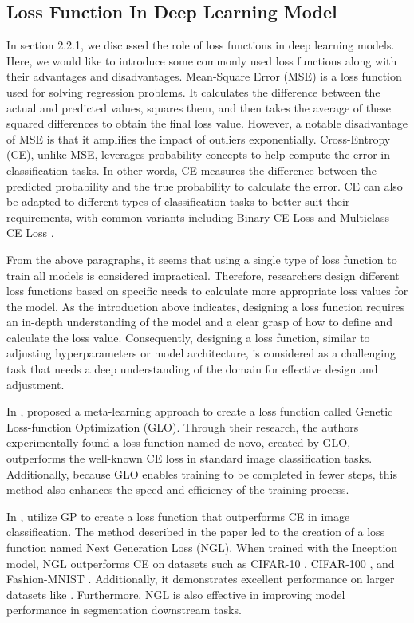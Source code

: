 \begin{ZhChapter}
    \subsection{Loss Function In Deep Learning Model}
    In section 2.2.1, we discussed the role of loss functions in deep learning models. Here, we would like to introduce some commonly used loss functions along with their advantages and disadvantages. Mean-Square Error (MSE) \cite{wang2009mean} is a loss function used for solving regression problems. It calculates the difference between the actual and predicted values, squares them, and then takes the average of these squared differences to obtain the final loss value. However, a notable disadvantage of MSE is that it amplifies the impact of outliers exponentially. Cross-Entropy (CE), unlike MSE, leverages probability concepts to help compute the error in classification tasks. In other words, CE measures the difference between the predicted probability and the true probability to calculate the error. CE can also be adapted to different types of classification tasks to better suit their requirements, with common variants including Binary CE Loss \cite{ruby2020binary} and Multiclass CE Loss \cite{plaquet2023powerset}.

    From the above paragraphs, it seems that using a single type of loss function to train all models is considered impractical. Therefore, researchers design different loss functions based on specific needs to calculate more appropriate loss values for the model. As the introduction above indicates, designing a loss function requires an in-depth understanding of the model and a clear grasp of how to define and calculate the loss value. Consequently, designing a loss function, similar to adjusting hyperparameters or model architecture, is considered as a challenging task that needs a deep understanding of the domain for effective design and adjustment.

    In \cite{gonzalez2020improvedtrainingspeedaccuracy}, \citeauthor{gonzalez2020improvedtrainingspeedaccuracy} proposed a meta-learning approach to create a loss function called Genetic Loss-function Optimization (GLO). Through their research, the authors experimentally found a loss function named de novo, created by GLO, outperforms the well-known CE loss in standard image classification tasks. Additionally, because GLO enables training to be completed in fewer steps, this method also enhances the speed and efficiency of the training process.

    In \cite{akhmedova2024generationlossfunctionimage}, \citeauthor{akhmedova2024generationlossfunctionimage} utilize GP to create a loss function that outperforms CE in image classification. The method described in the paper led to the creation of a loss function named Next Generation Loss (NGL). When trained with the Inception model, NGL outperforms CE on datasets such as CIFAR-10 \cite{CIFAR-10}, CIFAR-100 \cite{CIFAR-100}, and Fashion-MNIST \cite{xiao2017fashionmnistnovelimagedataset}. Additionally, it demonstrates excellent performance on larger datasets like  \cite{imagenet15russakovsky}. Furthermore, NGL is also effective in improving model performance in segmentation downstream tasks.


\end{ZhChapter}
